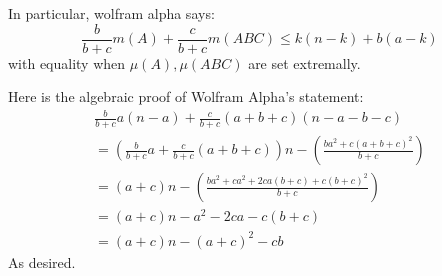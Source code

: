 \documentclass[twocolumn]{article}[11pt]
\begin{document}
In particular, wolfram alpha says:
$$\frac{b}{b+c}m(A) + \frac{c}{b+c}m(ABC) \le k(n-k) + b(a-k)$$
with equality when $\mu(A), \mu(ABC)$ are set extremally.

Here is the algebraic proof of Wolfram Alpha's statement:
\begin{multline*}
  \frac{b}{b+c}a(n-a) + \frac{c}{b+c}(a+b+c)(n-a-b-c)\\
  = \left(\frac{b}{b+c}a + \frac{c}{b+c}(a+b+c)\right) n - \left( \frac{ba^2 + c(a+b+c)^2}{b+c}\right)\\
  = (a+c) n - \left( \frac{ba^2 + ca^2 + 2ca(b+c) + c(b+c)^2}{b+c}\right)\\
  = (a+c) n - a^2 - 2ca - c(b+c)\\
  = (a+c) n - (a+c)^2 -cb
\end{multline*}
As desired.
\end{document}
